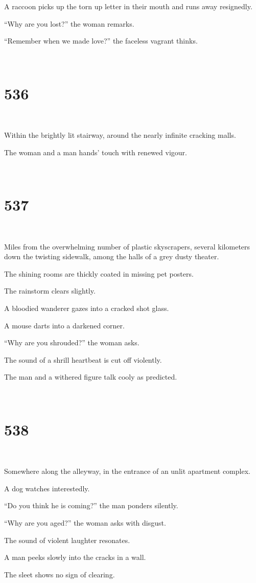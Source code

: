 \documentclass{report}
\begin{document}
A raccoon picks up the torn up letter in their mouth and runs away resignedly.

``Why are you lost?'' the woman remarks.

``Remember when we made love?'' the faceless vagrant thinks.

~
\chapter*{536}
~

Within the brightly lit stairway, around the nearly infinite cracking malls.

The woman and a man hands' touch with renewed vigour.

~
\chapter*{537}
~

Miles from the overwhelming number of plastic skyscrapers, several kilometers down the twisting sidewalk, among the halls of a grey dusty theater.

The shining rooms are thickly coated in missing pet posters.

The rainstorm clears slightly.

A bloodied wanderer gazes into a cracked shot glass.

A mouse darts into a darkened corner.

``Why are you shrouded?'' the woman asks.

The sound of a shrill heartbeat is cut off violently.

The man and a withered figure talk cooly as predicted.

~
\chapter*{538}
~

Somewhere along the alleyway, in the entrance of an unlit apartment complex.

A dog watches interestedly.

``Do you think he is coming?'' the man ponders silently.

``Why are you aged?'' the woman asks with disgust.

The sound of violent laughter resonates.

A man peeks slowly into the cracks in a wall.

The sleet shows no sign of clearing.
\end{document}

